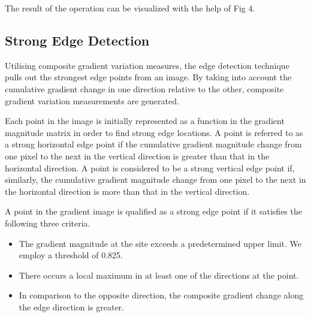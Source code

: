 \documentclass{70_styles/svproc}
\begin{document}
The result of the operation can be visualized with the help of Fig 4.

\subsection{Strong Edge Detection}
Utilising composite gradient variation measures, the edge detection technique pulls out the strongest edge points from an image. By taking into account the cumulative gradient change in one direction relative to the other, composite gradient variation measurements are generated.

Each point in the image is initially represented as a function in the gradient magnitude matrix in order to find strong edge locations. A point is referred to as a strong horizontal edge point if the cumulative gradient magnitude change from one pixel to the next in the vertical direction is greater than that in the horizontal direction. A point is considered to be a strong vertical edge point if, similarly, the cumulative gradient magnitude change from one pixel to the next in the horizontal direction is more than that in the vertical direction.

A point in the gradient image is qualified as a strong edge point if it satisfies the following three criteria.
\begin{itemize}
\item The gradient magnitude at the site exceeds a predetermined upper limit. We employ a threshold of 0.825.
\item There occurs a local maximum in at least one of the directions at the point.
\item In comparison to the opposite direction, the composite gradient change along the edge direction is greater.
\end{itemize}
\end{document}
